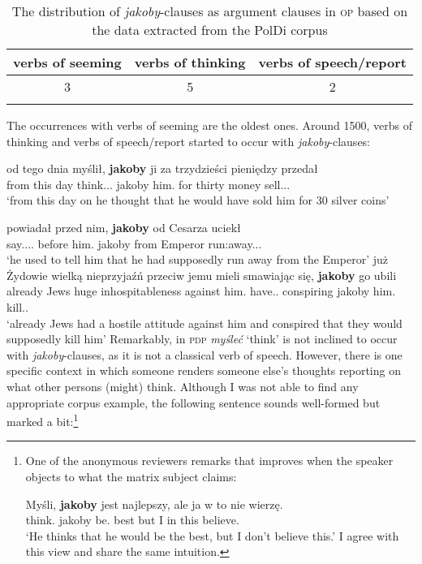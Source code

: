 \documentclass[output=paper]{langsci/langscibook}
\begin{document}
 \begin{table}[h]  \begin{tabular}{ccc}
 \lsptoprule
verbs of seeming & verbs of thinking & verbs of speech\slash report \\
\midrule
3 & 5 & 2  \\
 \lspbottomrule
\end{tabular}
\caption{The distribution of \emph{jakoby}-clauses as argument clauses in \textsc{op} based on the data extracted from the PolDi corpus} \label{staropolski_statystka_argument}
\end{table}

\noindent The occurrences with verbs of seeming are the oldest ones. Around 1500, verbs of thinking and verbs of speech\slash report started to occur with \emph{jakoby}-clauses:

\ea \gll od tego dnia myślił, \textbf{jakoby} ji za trzydzieści pieniędzy przedał \\
		from this day think.{\lptcp}.{\sg}.{\masc} jakoby him.{\acc} for thirty money sell.{\lptcp}.{\sg}.{\masc} \\
\glt	`from this day on he thought that he would have sold him for 30 silver coins' 
\z

\ea \ea \gll	powiadał przed nim, \textbf{jakoby} od Cesarza uciekł \\
		say.{\lptcp}.{\sg}.{\masc}.{\hab} before him.{\dat} jakoby from Emperor run:away.{\lptcp}.{\sg}.{\masc} \label{op_1} \\
	\glt	`he used to tell him that he had supposedly run away from the Emperor' 
	\ex\gll		  już Żydowie wielką nieprzyjaźń przeciw jemu mieli smawiając się, \textbf{jakoby} go ubili \label{op_2} \\
            already Jews huge inhospitableness against him.{\dat} have.{\lptcp}.{\vir} conspiring {} jakoby him.{\acc} kill.{\lptcp}.{\vir} \\
	\glt	`already Jews had a hostile attitude against him and conspired that they would supposedly kill him' 
    \z\z
Remarkably, in \textsc{pdp} \emph{myśleć} `think' is not inclined to occur with \emph{jakoby}-clauses, as it is not a classical verb of speech. However, there is one specific context in which someone renders someone else's thoughts reporting on what other persons (might) think. Although I was not able to find any appropriate corpus example, the following sentence sounds well-formed but marked a bit:\footnote{One of the anonymous reviewers remarks that  improves when the speaker objects to what the matrix subject claims:

\ea \gll Myśli, \textbf{jakoby} jest najlepszy, ale ja w to nie wierzę. \\
		think.{\thirdperson}{\sg} jakoby be.{\thirdperson}{\sg} best but I in this {\negation} believe.{\firstperson}{\sg} \\
\glt	 `He thinks that he would be the best, but I don't believe this.'
\z
I agree with this view and share the same intuition.
}
\end{document}
